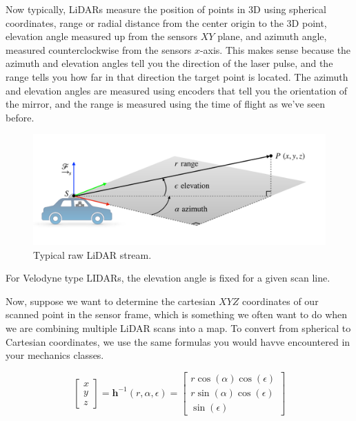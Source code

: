 Now typically, LiDARs measure the position of points in 3D using
spherical coordinates, range or radial distance from
the center origin to the 3D point, elevation angle measured up
from the sensors $XY$ plane, and azimuth angle, measured
counterclockwise from the sensors $x$-axis. This makes sense because
the azimuth and elevation angles tell you the direction
of the laser pulse, and the range tells you how far in that direction
the target point is located. The azimuth and elevation angles
are measured using encoders that tell you
the orientation of the mirror, and the range is measured using the time
of flight as we've seen before. 


\begin{figure}[!htb]
\begin{center}
\includegraphics[scale=0.280]{img/hardware/lidar_5.jpeg}
\end{center}
\caption{Typical raw LiDAR stream.}
\label{lidar_5}
\end{figure}

\begin{framed}
\theoremstyle{remark}
\begin{remark}{}

For Velodyne type LIDARs, the elevation angle is fixed
for a given scan line.
\end{remark}
\end{framed}

Now, suppose we want to
determine the cartesian $XYZ$ coordinates of our scanned point
in the sensor frame, which is something we often
want to do when we are combining multiple LiDAR scans into a map. To convert from spherical
to Cartesian coordinates, we use the same formulas you would havve encountered in your mechanics classes. 

\begin{equation}
\begin{bmatrix}
x \\
y \\
z 
\end{bmatrix} = \mathbf{h}^{-1}(r, \alpha, \epsilon) = 
\begin{bmatrix}
r\cos(\alpha)\cos(\epsilon) \\
r\sin(\alpha)\cos(\epsilon) \\
\sin(\epsilon) 
\end{bmatrix} 
\label{lidar_inverse_sensor_model}
\end{equation}

